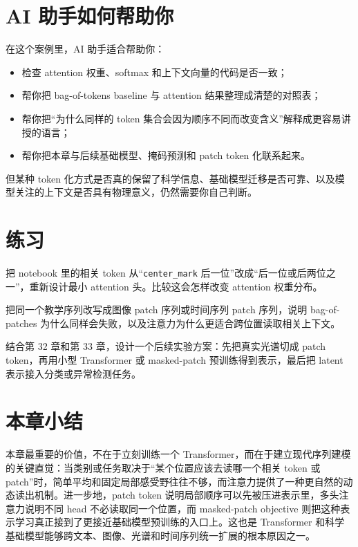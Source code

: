 \section{AI 助手如何帮助你}

在这个案例里，AI 助手适合帮助你：

\begin{itemize}
    \item 检查 attention 权重、softmax 和上下文向量的代码是否一致；
    \item 帮你把 bag-of-tokens baseline 与 attention 结果整理成清楚的对照表；
    \item 帮你把“为什么同样的 token 集合会因为顺序不同而改变含义”解释成更容易讲授的语言；
    \item 帮你把本章与后续基础模型、掩码预测和 patch token 化联系起来。
\end{itemize}

但某种 token 化方式是否真的保留了科学信息、基础模型迁移是否可靠、以及模型关注的上下文是否具有物理意义，仍然需要你自己判断。

\section{练习}

\begin{exercisebox}[基础练习]
把 notebook 里的相关 token 从“\texttt{center\_mark} 后一位”改成“后一位或后两位之一”，重新设计最小 attention 头。比较这会怎样改变 attention 权重分布。
\end{exercisebox}

\begin{exercisebox}[进阶练习]
把同一个教学序列改写成图像 patch 序列或时间序列 patch 序列，说明 bag-of-patches 为什么同样会失败，以及注意力为什么更适合跨位置读取相关上下文。
\end{exercisebox}

\begin{exercisebox}[开放练习]
结合第 32 章和第 33 章，设计一个后续实验方案：先把真实光谱切成 patch token，再用小型 Transformer 或 masked-patch 预训练得到表示，最后把 latent 表示接入分类或异常检测任务。
\end{exercisebox}

\section{本章小结}

本章最重要的价值，不在于立刻训练一个 Transformer，而在于建立现代序列建模的关键直觉：当类别或任务取决于“某个位置应该去读哪一个相关 token 或 patch”时，简单平均和固定局部感受野往往不够，而注意力提供了一种更自然的动态读出机制。进一步地，patch token 说明局部顺序可以先被压进表示里，多头注意力说明不同 head 不必读取同一个位置，而 masked-patch objective 则把这种表示学习真正接到了更接近基础模型预训练的入口上。这也是 Transformer 和科学基础模型能够跨文本、图像、光谱和时间序列统一扩展的根本原因之一。
